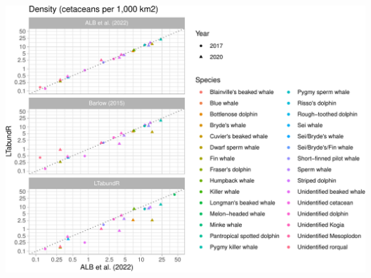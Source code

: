 \documentclass[
]{book}
\begin{document}
\includegraphics{figures/unnamed-chunk-383-1.pdf}

~
\end{document}
